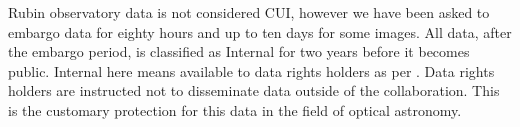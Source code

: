 Rubin observatory data is not considered \gls{CUI}, however we have been asked to embargo data for eighty hours and up to ten days for some images.
All data, after the embargo period,  is classified as Internal for two years before it becomes public.
Internal here means available to data rights holders as per .
Data rights holders are instructed not to disseminate data outside of the collaboration.
This is the customary protection for this data in the field of optical astronomy.






